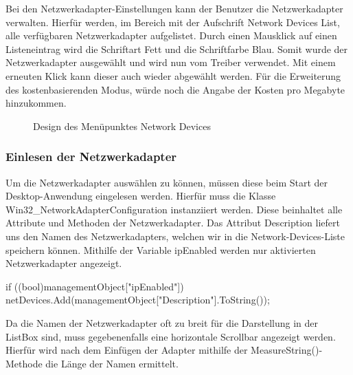 Bei den Netzwerkadapter-Einstellungen kann der Benutzer die Netzwerkadapter verwalten. Hierfür werden, im Bereich mit der Aufschrift Network Devices List, alle verfügbaren Netzwerkadapter aufgelistet. Durch einen Mausklick auf einen Listeneintrag wird die Schriftart Fett und die Schriftfarbe Blau. Somit wurde der Netzwerkadapter ausgewählt und wird nun vom Treiber verwendet. Mit einem erneuten Klick kann dieser auch wieder abgewählt werden. Für die Erweiterung des kostenbasierenden Modus, würde noch die Angabe der Kosten pro Megabyte hinzukommen.
\\
\begin{figure}[H]
    \centering
    \setlength{\fboxsep}{1pt}
	\setlength{\fboxrule}{1pt}
    \caption[Design des Menüpunktes Network Devices]{Design des Menüpunktes Network Devices} 
\end{figure}

\subsubsection{Einlesen der Netzwerkadapter}

Um die Netzwerkadapter auswählen zu können, müssen diese beim Start der Desktop-Anwendung eingelesen werden. Hierfür muss die Klasse Win32\_NetworkAdapterConfiguration instanziiert werden. Diese beinhaltet alle Attribute und Methoden der Netzwerkadapter. Das Attribut Description liefert uns den Namen des Netzwerkadapters, welchen wir in die Network-Devices-Liste speichern können. Mithilfe der Variable ipEnabled werden nur aktivierten Netzwerkadapter angezeigt.

\begin{program}[H]
\begin{CSharpCode}
if ((bool)managementObject["ipEnabled"])
{
    netDevices.Add(managementObject["Description"].ToString());
}
\end{CSharpCode}
\caption{Einlesen der Namen der aktiven Netzwerkadapter}
\end{program}
\noindent
Da die Namen der Netzwerkadapter oft zu breit für die Darstellung in der ListBox sind, muss gegebenenfalls eine horizontale Scrollbar angezeigt werden. Hierfür wird nach dem Einfügen der Adapter mithilfe der MeasureString()-Methode die Länge der Namen ermittelt.

\lstset{basicstyle=\footnotesize}

\pagebreak

